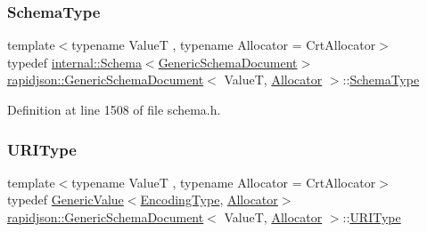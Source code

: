 \mbox{\label{classrapidjson_1_1_generic_schema_document_aaf4e7f371de938025f7ed4be3b83266e}} 
\subsubsection{\texorpdfstring{SchemaType}{SchemaType}}
{\footnotesize\ttfamily template$<$typename ValueT , typename Allocator  = Crt\+Allocator$>$ \\
typedef \mbox{\hyperlink{classrapidjson_1_1internal_1_1_schema}{internal\+::\+Schema}}$<$\mbox{\hyperlink{classrapidjson_1_1_generic_schema_document}{Generic\+Schema\+Document}}$>$ \mbox{\hyperlink{classrapidjson_1_1_generic_schema_document}{rapidjson\+::\+Generic\+Schema\+Document}}$<$ ValueT, \mbox{\hyperlink{classrapidjson_1_1_allocator}{Allocator}} $>$\+::\mbox{\hyperlink{classrapidjson_1_1_generic_schema_document_aaf4e7f371de938025f7ed4be3b83266e}{Schema\+Type}}}



Definition at line 1508 of file schema.\+h.

\mbox{\label{classrapidjson_1_1_generic_schema_document_a72e8240701d707953bfd806cddc995b6}} 
\subsubsection{\texorpdfstring{URIType}{URIType}}
{\footnotesize\ttfamily template$<$typename ValueT , typename Allocator  = Crt\+Allocator$>$ \\
typedef \mbox{\hyperlink{classrapidjson_1_1_generic_value}{Generic\+Value}}$<$\mbox{\hyperlink{classrapidjson_1_1_generic_schema_document_a019035fd281ca52874ed434ce4f7d4d8}{Encoding\+Type}}, \mbox{\hyperlink{classrapidjson_1_1_allocator}{Allocator}}$>$ \mbox{\hyperlink{classrapidjson_1_1_generic_schema_document}{rapidjson\+::\+Generic\+Schema\+Document}}$<$ ValueT, \mbox{\hyperlink{classrapidjson_1_1_allocator}{Allocator}} $>$\+::\mbox{\hyperlink{classrapidjson_1_1_generic_schema_document_a72e8240701d707953bfd806cddc995b6}{U\+R\+I\+Type}}}



